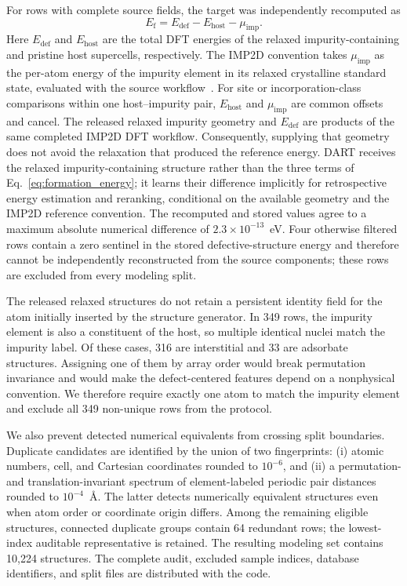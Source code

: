 For rows with complete source fields, the target was independently recomputed
as
\begin{equation}
 E_{\mathrm f}=E_{\mathrm{def}}-E_{\mathrm{host}}-\mu_{\mathrm{imp}}.
 \label{eq:formation_energy}
\end{equation}
Here $E_{\mathrm{def}}$ and $E_{\mathrm{host}}$ are the total DFT energies of
the relaxed impurity-containing and pristine host supercells, respectively.
The IMP2D convention takes $\mu_{\mathrm{imp}}$ as the per-atom energy of the
impurity element in its relaxed crystalline standard state, evaluated with the
source workflow~\cite{imp2d2023}.  For site or incorporation-class comparisons
within one host--impurity pair, $E_{\mathrm{host}}$ and
$\mu_{\mathrm{imp}}$ are common offsets and cancel.  The released relaxed
impurity geometry and $E_{\mathrm{def}}$ are products of the same completed
IMP2D DFT workflow.  Consequently, supplying that geometry does not avoid the
relaxation that produced the reference energy.  DART receives the relaxed
impurity-containing structure rather than the three terms of
Eq.~\eqref{eq:formation_energy}; it learns their difference implicitly for
retrospective energy estimation and reranking, conditional on the available
geometry and the IMP2D reference convention.
The recomputed and stored values agree to a maximum absolute numerical
difference of $2.3\times10^{-13}$~eV.  Four otherwise filtered rows contain a
zero sentinel in the stored defective-structure energy and therefore cannot be
independently reconstructed from the source components; these rows are
excluded from every modeling split.

The released relaxed structures do not retain a persistent identity field for
the atom initially inserted by the structure generator.  In 349 rows, the
impurity element is also a constituent of the host, so multiple identical
nuclei match the impurity label.  Of these cases, 316 are interstitial and 33
are adsorbate structures.  Assigning one of them by array order would
break permutation invariance and would make the defect-centered features
depend on a nonphysical convention.  We therefore require exactly one atom to
match the impurity element and exclude all 349 non-unique rows from the
protocol.

We also prevent detected numerical equivalents from crossing split
boundaries.  Duplicate candidates are identified by the union of two
fingerprints:
(i) atomic numbers, cell, and Cartesian coordinates rounded to
$10^{-6}$, and (ii) a permutation- and translation-invariant spectrum of
element-labeled periodic pair distances rounded to $10^{-4}$~\AA.  The latter
detects numerically equivalent structures even when atom order or coordinate
origin differs.  Among the remaining eligible structures, connected duplicate
groups contain 64 redundant rows; the lowest-index auditable representative is
retained.  The resulting modeling set contains 10,224 structures.  The
complete audit, excluded sample indices, database identifiers, and split files
are distributed with the code.

